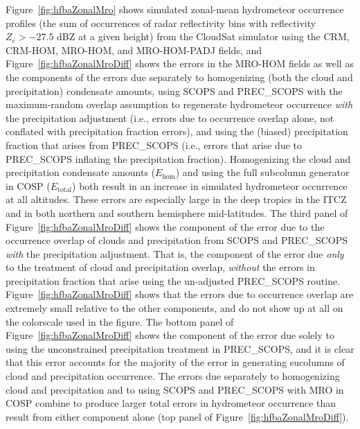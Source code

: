 Figure~\ref{fig:hfbaZonalMro} shows simulated zonal-mean hydrometeor
occurrence profiles (the sum of occurrences of radar reflectivity bins
with reflectivity \(Z_e > -27.5\) dBZ at a given height) from the
CloudSat simulator using the CRM, CRM-HOM, MRO-HOM, and MRO-HOM-PADJ
fields, and Figure~\ref{fig:hfbaZonalMroDiff} shows the errors in the
MRO-HOM fields as well as the components of the errors due separately to
homogenizing (both the cloud and precipitation) condensate amounts,
using SCOPS and PREC\_SCOPS with the maximum-random overlap assumption
to regenerate hydrometeor occurrence \emph{with} the precipitation
adjustment (i.e., errors due to occurrence overlap alone, not conflated
with precipitation fraction errors), and using the (biased)
precipitation fraction that arises from PREC\_SCOPS (i.e., errors that
arise due to PREC\_SCOPS inflating the precipitation fraction).
Homogenizing the cloud and precipitation condensate amounts
(\(E_\textrm{hom}\)) and using the full subcolumn generator in COSP
(\(E_\textrm{total}\)) both result in an increase in simulated
hydrometeor occurrence at all altitudes. These errors are especially
large in the deep tropics in the ITCZ and in both northern and southern
hemisphere mid-latitudes. The third panel of
Figure~\ref{fig:hfbaZonalMroDiff} shows the component of the error due
to the occurrence overlap of clouds and precipitation from SCOPS and
PREC\_SCOPS \emph{with} the precipitation adjustment. That is, the
component of the error due \emph{only} to the treatment of cloud and
precipitation overlap, \emph{without} the errors in precipitation
fraction that arise using the un-adjusted PREC\_SCOPS routine.
Figure~\ref{fig:hfbaZonalMroDiff} shows that the errors due to
occurrence overlap are extremely small relative to the other components,
and do not show up at all on the colorscale used in the figure. The
bottom panel of Figure~\ref{fig:hfbaZonalMroDiff} shows the component of
the error due solely to using the unconstrained precipitation treatment
in PREC\_SCOPS, and it is clear that this error accounts for the
majority of the error in generating sucolumns of cloud and precipitation
occurrence. The errors due separately to homogenizing cloud and
precipitation and to using SCOPS and PREC\_SCOPS with MRO in COSP
combine to produce larger total errors in hydrometeor occurrence than
result from either component alone (top panel of
Figure~\ref{fig:hfbaZonalMroDiff}).

